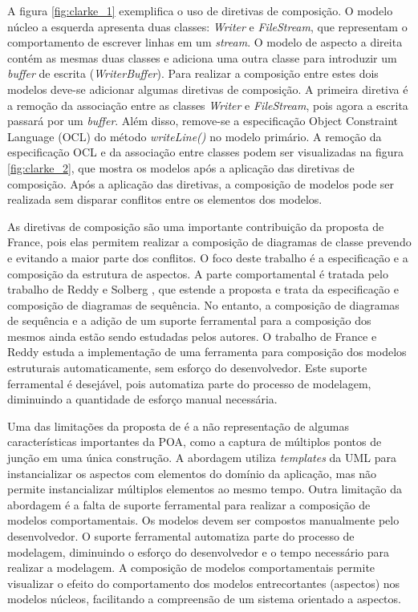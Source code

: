 A figura \ref{fig:clarke_1} exemplifica o uso de diretivas de composição. O modelo núcleo a esquerda apresenta duas classes: \textit{Writer} e
\textit{FileStream}, que representam o comportamento de escrever linhas em um \textit{stream}. O modelo de aspecto a direita contém as mesmas duas
classes e adiciona uma outra classe para introduzir um \textit{buffer} de escrita (\textit{WriterBuffer}). Para realizar a composição entre estes dois
modelos deve-se adicionar algumas diretivas de composição. A primeira diretiva é a remoção da associação entre as classes \textit{Writer} e
\textit{FileStream}, pois agora a escrita passará por um \textit{buffer}. Além disso, remove-se a especificação Object Constraint Language (OCL)
\cite{ocl:12} do método \textit{writeLine()} no modelo primário. A remoção da especificação OCL e da associação entre classes podem ser visualizadas
na figura \ref{fig:clarke_2}, que mostra os modelos após a aplicação das diretivas de composição. Após a aplicação das diretivas, a composição de modelos pode ser realizada sem disparar conflitos entre
os elementos dos modelos.

As diretivas de composição são uma importante contribuição da proposta de France, pois elas permitem realizar a composição de diagramas de classe
prevendo e evitando a maior parte dos conflitos. O foco deste trabalho é a especificação e a composição da estrutura de aspectos. A parte
comportamental é tratada pelo trabalho de Reddy e Solberg \cite{ReddySolberg}, que estende a proposta e trata da especificação e composição 
de diagramas de sequência. No entanto, a composição de diagramas de sequência e a adição de um suporte ferramental para a composição dos mesmos ainda estão
sendo estudadas pelos autores. O trabalho de France e Reddy \cite{FranceReddy} estuda a implementação de uma ferramenta para composição dos modelos
estruturais automaticamente, sem esforço do desenvolvedor. Este suporte ferramental é desejável, pois automatiza parte do processo de modelagem,
diminuindo a quantidade de esforço manual necessária.

Uma das limitações da proposta de \cite{france:06} é a não representação de algumas características importantes da POA, como a captura de múltiplos
pontos de junção em uma única construção. A abordagem utiliza \textit{templates} da UML para instancializar os aspectos com elementos do domínio da
aplicação, mas não permite instancializar múltiplos elementos ao mesmo tempo. Outra limitação da abordagem é a falta de suporte ferramental para
realizar a composição de modelos comportamentais. Os modelos devem ser compostos manualmente pelo desenvolvedor. O suporte ferramental automatiza
parte do processo de modelagem, diminuindo o esforço do desenvolvedor e o tempo necessário para realizar a modelagem. A composição de modelos
comportamentais permite visualizar o efeito do comportamento dos modelos entrecortantes (aspectos) nos modelos núcleos, facilitando a compreensão de
um sistema orientado a aspectos.

